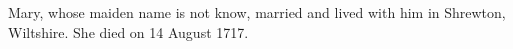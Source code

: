 
Mary, whose maiden name is not know, married  and lived with him in Shrewton, Wiltshire.
She died on 14 August 1717.\cite{ThomasMundayDeath}
